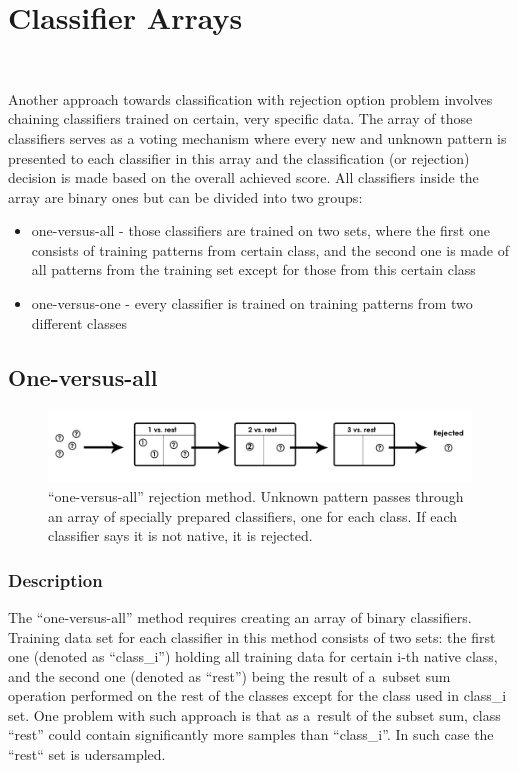 \section{Classifier Arrays} \ \label{classifier_arrays}

Another approach towards classification with rejection option problem involves chaining classifiers trained on certain, very specific data. The array of those classifiers serves as a voting mechanism where every new and unknown pattern is presented to each classifier in this array and the classification (or rejection) decision is made based on the overall achieved score. All classifiers inside the array are binary ones but can be divided into two groups:
\begin{itemize}
	\item one-versus-all - those classifiers are trained on two sets, where the first one consists of training patterns from certain class, and the second one is made of all patterns from the training set except for those from this certain class
	\item one-versus-one - every classifier is trained on training patterns from two different classes
\end{itemize}

\subsection{One-versus-all}

\begin{figure}[htp]
	\centering
	\includegraphics[width=1\textwidth]{Figures/classification_with_rejection1.jpg}
	\caption{``one-versus-all'' rejection method. Unknown pattern passes through an array of specially prepared classifiers, one for each class. If each classifier says it is not native, it is rejected. }
	\label{fig:rejection_version1}\vspace{-3pt}
\end{figure}

\subsubsection{Description}

The ``one-versus-all'' method requires creating an array of binary classifiers. Training data set for each classifier in this method consists of two sets: the first one (denoted as ``class\_i'') holding all training data for certain i-th native class, and the second one (denoted as ``rest'') being the result of a~subset sum operation performed on the rest of the classes except for the class used in class\_i set. One problem with such approach is that as a~result of the subset sum, class ``rest'' could contain significantly more samples than ``class\_i''. In such case the ``rest`` set is udersampled. 

